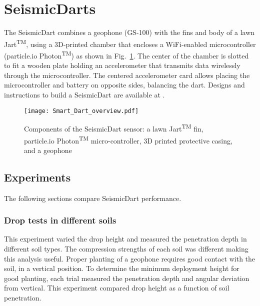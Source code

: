 \section{SeismicDarts}\label{sec:SeismicDarts}

The SeismicDart combines a geophone (GS-100) with the fins and body of a lawn Jart\textsuperscript{TM}, using a 3D-printed chamber that encloses a WiFi-enabled microcontroller (particle.io Photon\textsuperscript{TM}) as shown in Fig.~\ref{fig:Smart_Dart_overview}. 
The center of the chamber is slotted to fit a wooden plate holding an accelerometer that transmits data wirelessly through the microcontroller. 
The centered accelerometer card allows placing the microcontroller and battery on opposite sides, balancing the dart.
Designs and instructions to build a SeismicDart are available at \cite{Victor2016Thingiverse}.



\begin{figure} \centering
{\texttt{[image: Smart\_Dart\_overview.pdf]}}
\caption{Components of the SeismicDart sensor: a lawn  Jart\textsuperscript{TM} fin, particle.io Photon\textsuperscript{TM}  micro-controller, 3D printed protective casing, and a geophone} 
\label{fig:Smart_Dart_overview}
\end{figure}

\subsection{Experiments} 
The following sections compare SeismicDart performance.
\subsubsection{ Drop tests in different soils}  
This experiment varied the drop height and measured the penetration depth in different soil types. The compression strengths of each soil was different making this analysis useful. 
Proper planting of a geophone requires good contact with the soil, in a vertical position. 
To determine the minimum deployment height for good planting, each trial measured the penetration depth and angular deviation from vertical. 
This experiment compared drop height as a function of soil penetration. 

